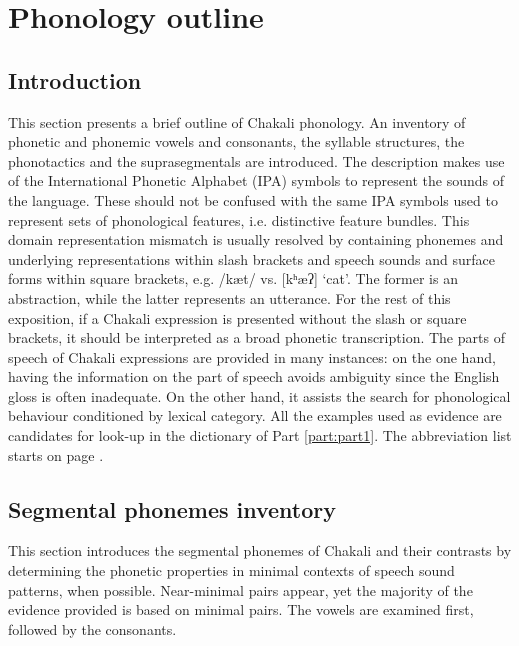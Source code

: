 
\chapter{Phonology outline}
\label{sec:chap-phono}


\section{Introduction}
\label{sec:intro-phono}


This section presents a brief outline of Chakali phonology. An inventory of phonetic and phonemic vowels and consonants, the syllable structures, the phonotactics and the suprasegmentals are introduced.   The description makes use of the International Phonetic Alphabet (IPA)  symbols to represent the sounds of the language. These should not be confused with the same IPA symbols used to represent  sets of phonological features, i.e.  distinctive feature bundles. This domain representation mismatch is usually resolved by containing phonemes and underlying representations within slash brackets  and  speech sounds and surface forms within square brackets, e.g.  /kæt/ vs.  [kʰæʔ]  `cat'. The former is an abstraction, while the latter represents an utterance.  For the rest of this exposition, if a Chakali expression is presented without the slash or  square brackets, it should be interpreted as a broad phonetic transcription. The parts of speech of  Chakali expressions are provided in many instances: on the one hand,  having the  information on the part of speech avoids ambiguity since the English gloss is often inadequate. On the other hand,  it assists the search for phonological behaviour conditioned by lexical category.  All the examples used as evidence are candidates for look-up in the dictionary of Part \ref{part:part1}. The abbreviation list starts on page \pageref{sec-ABB}.

\newpage 
\section{Segmental phonemes inventory}
\label{sec:seg-phon-invent}

This section introduces the segmental phonemes of Chakali and their contrasts 
by determining the phonetic properties in minimal contexts of speech sound 
patterns, when possible.  Near-minimal pairs appear, yet the majority of the 
evidence provided is based on  minimal pairs. The vowels are examined first, 
followed by the consonants.

